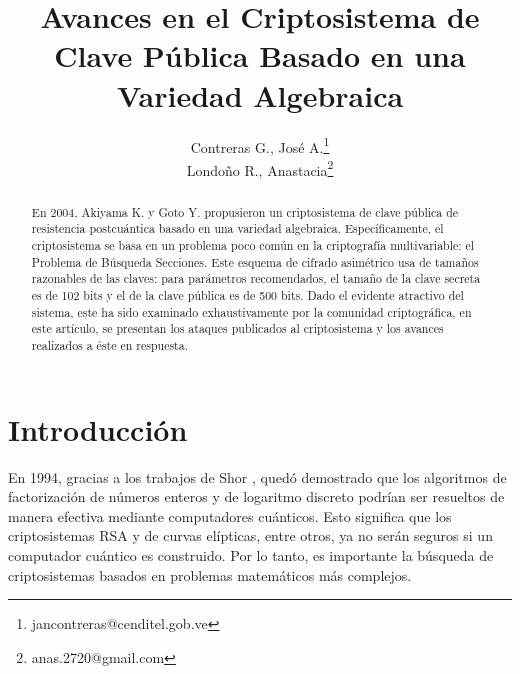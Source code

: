\documentclass[11pt]{article}
\title{Avances en el Criptosistema de Clave P\'ublica Basado en una Variedad Algebraica}
\author{Contreras G., Jos\'e A.\footnote{jancontreras@cenditel.gob.ve}\\ Londo\~no R., Anastacia\footnote{anas.2720@gmail.com}}
\numberwithin{equation}{section} %
\numberwithin{figure}{section} %
\numberwithin{table}{section} %
\begin{document}
	\maketitle


	\begin{abstract}
		En 2004, Akiyama K. y Goto Y. \cite{AG04} propusieron un criptosistema de clave p\'ublica de resistencia postcu\'antica basado en una variedad algebraica. Espec\'ificamente, el criptosistema se basa en un problema poco com\'un en la criptograf\'ia multivariable: el Problema de B\'usqueda Secciones. Este esquema de cifrado asim\'etrico usa de tamaños razonables de las claves: para par\'ametros recomendados, el tamaño de la clave secreta es de 102 bits y el de la clave p\'ublica es de 500 bits. Dado el evidente atractivo del sistema, este ha sido examinado exhaustivamente por la comunidad criptogr\'afica, en este art\'iculo, se presentan los ataques publicados al criptosistema y los avances realizados a \'este en respuesta.
	\end{abstract}



	\section{Introducci\'on}

		En 1994, gracias a los trabajos de Shor \cite{Shor}, qued\'o demostrado que los algoritmos de factorizaci\'on de n\'umeros enteros y de logaritmo discreto podr\'ian ser resueltos de manera efectiva mediante computadores cu\'anticos. Esto significa que los criptosistemas RSA y de curvas el\'ipticas, entre otros, ya no ser\'an seguros si un computador cu\'antico es construido. Por lo tanto, es importante la b\'usqueda de criptosistemas basados en problemas matem\'aticos m\'as complejos.\\
\end{document}
